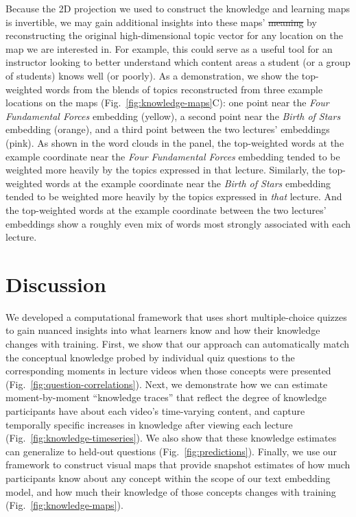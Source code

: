 \documentclass[10pt]{article}
\providecommand{\DIFaddtex}[1]{{\protect\color{blue}\uwave{#1}}} %
\providecommand{\DIFdeltex}[1]{{\protect\color{red}\sout{#1}}}                      %
\providecommand{\DIFaddbegin}{} %
\providecommand{\DIFaddend}{} %
\providecommand{\DIFdelbegin}{} %
\providecommand{\DIFdelend}{} %
\providecommand{\DIFadd}[1]{\texorpdfstring{\DIFaddtex{#1}}{#1}} %
\providecommand{\DIFdel}[1]{\texorpdfstring{\DIFdeltex{#1}}{}} %
\newcommand{\DIFscaledelfig}{0.5}
\newlength{\DIFdelgraphicswidth} %
\newlength{\DIFdelgraphicsheight} %
\newcommand{\DIFaddincludegraphics}[2][]{{\color{blue}\fbox{\DIFOincludegraphics[#1]{#2}}}} %
\newcommand{\DIFdelincludegraphics}[2][]{%
\sbox{\DIFdelgraphicsbox}{\DIFOincludegraphics[#1]{#2}}%
\settoboxwidth{\DIFdelgraphicswidth}{\DIFdelgraphicsbox} %
\settoboxtotalheight{\DIFdelgraphicsheight}{\DIFdelgraphicsbox} %
\scalebox{\DIFscaledelfig}{%
\parbox[b]{\DIFdelgraphicswidth}{\usebox{\DIFdelgraphicsbox}\\[-\baselineskip] \rule{\DIFdelgraphicswidth}{0em}}\llap{\resizebox{\DIFdelgraphicswidth}{\DIFdelgraphicsheight}{%
\setlength{\unitlength}{\DIFdelgraphicswidth}%
\begin{picture}(1,1)%
\thicklines\linethickness{2pt} %
{\color[rgb]{1,0,0}\put(0,0){\framebox(1,1){}}}%
{\color[rgb]{1,0,0}\put(0,0){\line( 1,1){1}}}%
{\color[rgb]{1,0,0}\put(0,1){\line(1,-1){1}}}%
\end{picture}%
}\hspace*{3pt}}} %
} %
\DeclareRobustCommand{\DIFaddbegin}{\DIFOaddbegin \let\includegraphics\DIFaddincludegraphics} %
\DeclareRobustCommand{\DIFaddend}{\DIFOaddend \let\includegraphics\DIFOincludegraphics} %
\DeclareRobustCommand{\DIFdelbegin}{\DIFOdelbegin \let\includegraphics\DIFdelincludegraphics} %
\DeclareRobustCommand{\DIFdelend}{\DIFOaddend \let\includegraphics\DIFOincludegraphics} %
\begin{document}
Because the 2D projection we used to construct the knowledge and learning maps
is invertible, we may gain additional insights into these maps' \DIFdelbegin \DIFdel{meaning
}\DIFdelend \DIFaddbegin \DIFadd{meanings }\DIFaddend by
reconstructing the original high-dimensional topic vector for any location on
the map we are interested in. For example, this could serve as a useful tool
for an instructor looking to better understand which content areas a student
(or a group of students) knows well (or poorly). As a demonstration, we show
the top-weighted words from the blends of topics reconstructed from three
example locations on the maps (Fig.~\ref{fig:knowledge-maps}C): one point near
the \textit{Four Fundamental Forces} embedding (yellow), a second point near
the \textit{Birth of Stars} embedding (orange), and a third point between the
two lectures' embeddings (pink). As shown in the word clouds in the panel, the
top-weighted words at the example coordinate near the \textit{Four Fundamental
Forces} embedding tended to be weighted more heavily by the topics expressed in
that lecture. Similarly, the top-weighted words at the example coordinate near
the \textit{Birth of Stars} embedding tended to be weighted more heavily by the
topics expressed in \textit{that} lecture. And the top-weighted words at the
example coordinate between the two lectures' embeddings show a roughly even mix
of words most strongly associated with each lecture.

\section*{Discussion}

We developed a computational framework that uses short multiple-choice quizzes
to gain nuanced insights into what learners know and how their knowledge
changes with training. First, we show that our approach can automatically match
the conceptual knowledge probed by individual quiz questions to the
corresponding moments in lecture videos when those concepts were presented
(Fig.~\ref{fig:question-correlations}). Next, we demonstrate how we can
estimate moment-by-moment ``knowledge traces'' that reflect the degree of
knowledge participants have about each video's time-varying content, and
capture temporally specific increases in knowledge after viewing each lecture
(Fig.~\ref{fig:knowledge-timeseries}). We also show that these knowledge
estimates can generalize to held-out questions (Fig.~\ref{fig:predictions}).
Finally, we use our framework to construct visual maps that provide snapshot
estimates of how much participants know about any concept within the scope of
our text embedding model, and how much their knowledge of those concepts
changes with training (Fig.~\ref{fig:knowledge-maps}).
\end{document}
